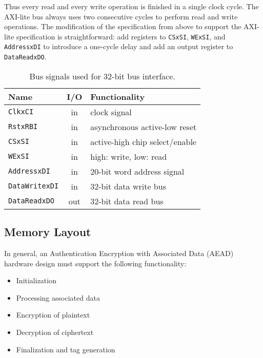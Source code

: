 \documentclass[runningheads]{llncs}
\begin{document}
Thus every read and every write operation is finished in a single clock cycle. The AXI-lite bus always uses two consecutive cycles to perform read and write operations. The modification of the specification from above to support the AXI-lite specification is straightforward: add registers to \texttt{CSxSI}, \texttt{WExSI}, and \texttt{AddressxDI} to introduce a one-cycle delay and add an output register to \texttt{DataReadxDO}.

\begin{table}[htb]
\caption{Bus signals used for 32-bit bus interface.}
\label{tbl:bus-signals}
\centering
\begin{tabular}{l@{\hskip 16pt}c@{\hskip 16pt}l} \toprule
Name & I/O & Functionality \\ \midrule %
\texttt{ClkxCI}  & in & clock signal \\
\texttt{RstxRBI} & in & asynchronous active-low reset \\
\texttt{CSxSI}   & in & active-high chip select/enable \\
\texttt{WExSI}   & in & high: write, low: read \\
\texttt{AddressxDI}   & in & 20-bit word address signal \\
\texttt{DataWritexDI} & in & 32-bit data write bus \\
\texttt{DataReadxDO}  & out & 32-bit data read bus \\
  \bottomrule %
\end{tabular}
\end{table}%

\subsection{Memory Layout}

In general, an Authentication Encryption with Associated Data (AEAD) hardware design must support the following functionality: 

\begin{itemize}
\item Initialization
\item Processing associated data
\item Encryption of plaintext
\item Decryption of ciphertext
\item Finalization and tag generation
\end{itemize}
\end{document}
